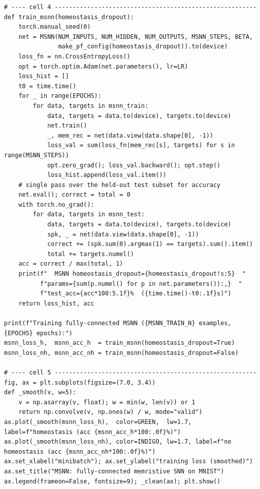 \begin{lstlisting}[caption={experiments/examples.ipynb},label={lst:mnn-nb-examples}]
# ---- cell 4 --------------------------------------------------------
def train_msnn(homeostasis_dropout):
    torch.manual_seed(0)
    net = MSNN(NUM_INPUTS, NUM_HIDDEN, NUM_OUTPUTS, MSNN_STEPS, BETA,
               make_pf_config(homeostasis_dropout)).to(device)
    loss_fn = nn.CrossEntropyLoss()
    opt = torch.optim.Adam(net.parameters(), lr=LR)
    loss_hist = []
    t0 = time.time()
    for _ in range(EPOCHS):
        for data, targets in msnn_train:
            data, targets = data.to(device), targets.to(device)
            net.train()
            _, mem_rec = net(data.view(data.shape[0], -1))
            loss_val = sum(loss_fn(mem_rec[s], targets) for s in range(MSNN_STEPS))
            opt.zero_grad(); loss_val.backward(); opt.step()
            loss_hist.append(loss_val.item())
    # single pass over the held-out test subset for accuracy
    net.eval(); correct = total = 0
    with torch.no_grad():
        for data, targets in msnn_test:
            data, targets = data.to(device), targets.to(device)
            spk, _ = net(data.view(data.shape[0], -1))
            correct += (spk.sum(0).argmax(1) == targets).sum().item()
            total += targets.numel()
    acc = correct / max(total, 1)
    print(f"  MSNN homeostasis_dropout={homeostasis_dropout!s:5}  "
          f"params={sum(p.numel() for p in net.parameters()):,}  "
          f"test_acc={acc*100:5.1f}%  ({time.time()-t0:.1f}s)")
    return loss_hist, acc

print(f"Training fully-connected MSNN ({MSNN_TRAIN_N} examples, {EPOCHS} epochs):")
msnn_loss_h,  msnn_acc_h  = train_msnn(homeostasis_dropout=True)
msnn_loss_nh, msnn_acc_nh = train_msnn(homeostasis_dropout=False)

# ---- cell 5 --------------------------------------------------------
fig, ax = plt.subplots(figsize=(7.0, 3.4))
def _smooth(v, w=5):
    v = np.asarray(v, float); w = min(w, len(v)) or 1
    return np.convolve(v, np.ones(w) / w, mode="valid")
ax.plot(_smooth(msnn_loss_h),  color=GREEN,  lw=1.7, label=f"homeostasis (acc {msnn_acc_h*100:.0f}%)")
ax.plot(_smooth(msnn_loss_nh), color=INDIGO, lw=1.7, label=f"no homeostasis (acc {msnn_acc_nh*100:.0f}%)")
ax.set_xlabel("minibatch"); ax.set_ylabel("training loss (smoothed)")
ax.set_title("MSNN: fully-connected memristive SNN on MNIST")
ax.legend(frameon=False, fontsize=9); _clean(ax); plt.show()


\end{lstlisting}
